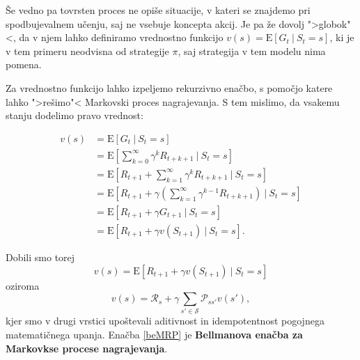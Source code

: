 \documentclass[12pt,a4paper]{amsart}
\theoremstyle{definition} %
\theoremstyle{plain} %
\begin{document}
Še vedno pa tovrsten proces ne opiše situacije, v kateri se znajdemo pri spodbujevalnem učenju, saj 
ne vsebuje koncepta akcij. Je pa že dovolj ">globok"<, da v njem lahko definiramo vrednostno 
funkcijo $v(s) = \mathrm{E} [G_t~|~S_t = s]$, ki je v tem primeru neodvisna od strategije $\pi$, 
saj strategija v tem modelu nima pomena. 

Za vrednostno funkcijo lahko izpeljemo rekurzivno enačbo, s pomočjo katere lahko ">rešimo"< Markovski
proces nagrajevanja. S tem mislimo, da vsakemu stanju dodelimo pravo vrednost:

\begin{align*}
    v(s) &= \mathrm{E} [G_t~|~S_t = s] \\
         &= \mathrm{E} [\sum_{k=0}^\infty \gamma^k R_{t + k + 1}~|~S_t = s] \\
         &= \mathrm{E} [R_{t+1} + \sum_{k=1}^\infty \gamma^k R_{t + k + 1}~|~S_t = s] \\
         &= \mathrm{E} [R_{t+1} + \gamma(\sum_{k=1}^\infty \gamma^{k-1} R_{t + k + 1})~|~S_t = s] \\
         &= \mathrm{E} [R_{t+1} + \gamma G_{t+1}~|~S_t = s] \\
         &= \mathrm{E} [R_{t+1} + \gamma v(S_{t+1})~|~S_t = s].
\end{align*}

Dobili smo torej 
$$
v(s) = \mathrm{E} [R_{t+1} + \gamma v(S_{t+1})~|~S_t = s]
$$
oziroma 
\begin{equation}\label{beMRP}
    v(s) = \mathcal{R}_s + \gamma \sum_{s' \in \mathcal{S}} \mathcal{P}_{ss'} v(s'),
\end{equation} 
kjer smo v drugi vrstici upoštevali aditivnost in idempotentnost pogojnega matematičnega upanja. 
Enačba \eqref{beMRP} je \textbf{Bellmanova enačba za Markovkse procese nagrajevanja}.
\end{document}
